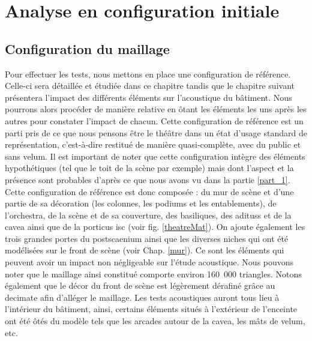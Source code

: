	
\chapter{Analyse en configuration initiale}
	\minitoc
	\newpage
	

	\section{Configuration du maillage} \label{sect_config_init}
Pour effectuer les tests, nous mettons en place une configuration de référence. Celle-ci sera détaillée et étudiée dans ce chapitre tandis que le chapitre suivant présentera l'impact des différents éléments sur l'acoustique du bâtiment. Nous pourrons alors procéder de manière relative en ôtant les éléments les uns après les autres pour constater l'impact de chacun. Cette configuration de référence est un parti pris de ce que nous pensons être le théâtre dans un état d'usage standard de représentation, c'est-à-dire restitué de manière quasi-complète, avec du public et sans \gls{velum}. Il est important de noter que cette configuration intègre des éléments hypothétiques (tel que le toit de la scène par exemple) mais dont l'aspect et la présence sont probables d'après ce que nous avons vu dans la partie \ref{part_1}. Cette configuration de référence est donc composée : du mur de scène et d'une partie de sa décoration (les colonnes, les \glspl{podium} et les entablements), de l'\gls{orchestra}, de la scène et de sa couverture, des basiliques, des \glspl{aditus} et de la \gls{cavea} ainsi que de la \gls{porticus isc} (voir fig. \ref{theatreMat}). On ajoute également les trois grandes portes du \gls{postscaenium} ainsi que les diverses niches qui ont été modélisées sur le front de scène (voir Chap. \ref{mur}). Ce sont les éléments qui peuvent avoir un impact non négligeable sur l'étude acoustique. Nous pouvons noter que le maillage ainsi constitué comporte environ 160~000 triangles. Notons également que le décor du front de scène est légèrement dérafiné grâce au \gls{decimate} afin d'alléger le maillage. Les tests acoustiques auront tous lieu à l'intérieur du bâtiment, ainsi, certains éléments situés à l'extérieur de l'enceinte ont été ôtés du modèle tels que les arcades autour de la \gls{cavea}, les mâts de \gls{velum}, etc. 

